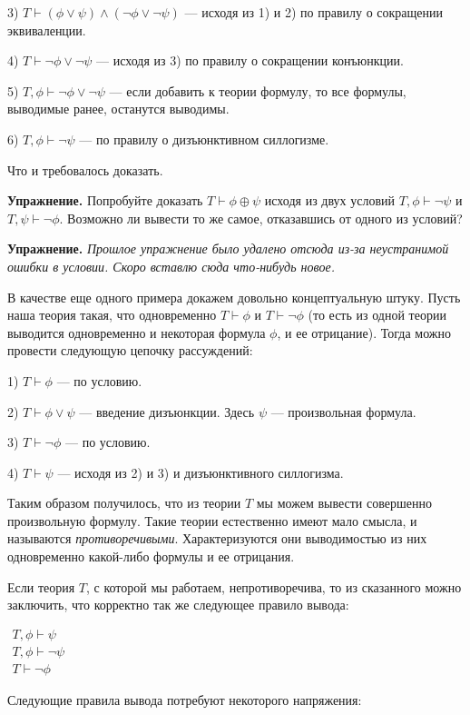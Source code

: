 3) $T\vdash (\phi\vee \psi) \wedge (\neg \phi \vee \neg \psi)$ — исходя из 1) и 2) по правилу о сокращении эквиваленции.

4) $T\vdash \neg \phi \vee \neg \psi$ — исходя из 3) по правилу о сокращении конъюнкции.

5) $T, \phi \vdash \neg \phi \vee \neg \psi$ — если добавить к теории формулу, то все формулы, выводимые ранее, останутся выводимы.

6) $T, \phi \vdash \neg \psi$ —  по правилу о дизъюнктивном силлогизме.

Что и требовалось доказать.

{\bfseries Упражнение.} Попробуйте доказать $T\vdash \phi\oplus\psi$ исходя из двух условий $T, \phi \vdash \neg \psi$ и $T, \psi \vdash \neg \phi$. Возможно ли вывести то же самое, отказавшись от одного из условий?

{\bfseries Упражнение.} {\slshape Прошлое упражнение было удалено отсюда из-за неустранимой ошибки в условии. Скоро вставлю сюда что-нибудь новое.}

В качестве еще одного примера докажем довольно концептуальную штуку. Пусть наша теория такая, что одновременно $T\vdash\phi$ и $T\vdash\neg\phi$ (то есть из одной теории выводится одновременно и некоторая формула $\phi$, и ее отрицание). Тогда можно провести следующую цепочку рассуждений:

1) $T\vdash\phi$ — по условию.

2) $T\vdash\phi\vee\psi$ — введение дизъюнкции. Здесь $\psi$ — произвольная формула.

3) $T\vdash\neg\phi$ — по условию.

4) $T\vdash\psi$ — исходя из 2) и 3) и дизъюнктивного силлогизма.

Таким образом получилось, что из теории $T$ мы можем вывести совершенно произвольную формулу. Такие теории естественно имеют мало смысла, и называются {\slshape противоречивыми}. Характеризуются они выводимостью из них одновременно какой-либо формулы и ее отрицания.

Если теория $T$, с которой мы работаем, непротиворечива, то из сказанного можно заключить, что корректно так же следующее правило вывода:

$\begin{array}{l} T,\phi\vdash\psi\\ T,\phi\vdash\neg\psi\\ \hline T\vdash\neg\phi\end{array}$

Следующие правила вывода потребуют некоторого напряжения:

